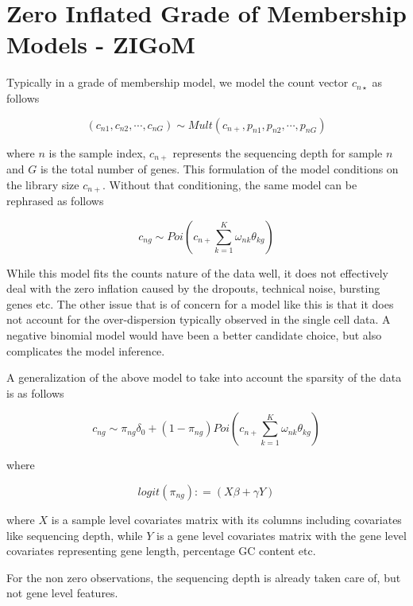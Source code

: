 \documentclass[a4paper, 12pt]{article}
\begin{document}
\section{Zero Inflated Grade of Membership Models - ZIGoM}

Typically in a grade of membership model, we model the count vector $c_{n\star}$ as follows 

$$ \left ( c_{n1}, c_{n2}, \cdots, c_{nG} \right) \sim Mult \left(c_{n+}, p_{n1}, p_{n2}, \cdots, p_{nG} \right) $$

where $n$ is the sample index, $c_{n+}$ represents the sequencing depth for sample $n$ and $G$ is the  total number of genes. This formulation of the model conditions on the library size $c_{n+}$. Without that conditioning, the same model can be rephrased as follows 

$$ c_{ng} \sim Poi \left (c_{n+} \sum_{k=1}^{K} \omega_{nk} \theta_{kg} \right) $$

While this model fits the counts nature of the data well, it does not effectively deal with the zero inflation caused by the dropouts, technical noise, bursting genes etc. The other issue that is of concern for a model like this is that it does not account for the over-dispersion typically observed in the single cell data. A negative binomial model would have been a better candidate choice, but also complicates the model inference.

A generalization of the above model to take into account the sparsity of the data is as follows

$$ c_{ng} \sim \pi_{ng} \delta_{0}  + (1- \pi_{ng}) Poi \left (c_{n+} \sum_{k=1}^{K} \omega_{nk} \theta_{kg} \right) $$

where 

$$ logit(\pi_{ng}) : = \left ( X \beta + \gamma Y \right) $$

where $X$ is a sample level covariates matrix with its columns including covariates like sequencing depth, while $Y$ is a gene level covariates matrix with the gene level covariates representing gene length, percentage GC content etc.

For the non zero observations, the sequencing depth is already taken care of, but not gene level features.
\end{document}
